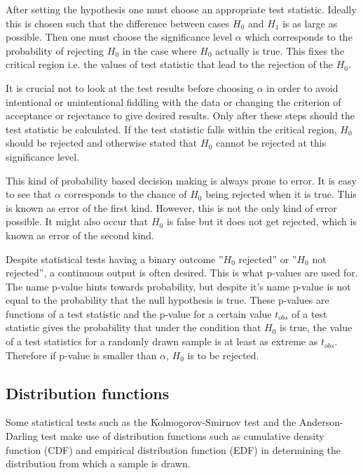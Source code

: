 \documentclass[english, oneside]{HYgradu}
\begin{document}
After setting the hypothesis one must choose an appropriate test statistic. Ideally this is chosen such that the difference between cases $H_0$ and $H_1$ is as large as possible. Then one must choose 
the significance level $\alpha$ which corresponds to the probability of rejecting $H_0$ in the case where $H_0$ actually is true. This fixes the critical region i.e. the values of test statistic that lead to the rejection of the $H_0$. \citep{bohm2010introduction, wall2003practical}

\reversemarginpar
{}
It is crucial not to look at the test results before choosing $\alpha$ in order to avoid intentional or unintentional fiddling with the data or changing the criterion of acceptance or rejectance to give desired results. Only after these steps should the test statistic be calculated. If the test statistic falls within the critical region, $H_0$ should be rejected and otherwise stated that $H_0$ cannot be rejected at this significance level. \citep{bohm2010introduction, wall2003practical}

This kind of probability based decision making is always prone to error. It is easy to see that $\alpha$ corresponds to the chance of $H_0$ being rejected when it is true. This is known as error of the first kind. However, this is not the only kind of error possible. It might also occur that $H_0$ is false but it does not get rejected, which is known as error of the second kind. \citep{bohm2010introduction}

Despite statistical tests having a binary outcome ''$H_0$ rejected'' or ''$H_0$ not rejected'', a continuous output is often desired. This is what p-values are used for. The name p-value hints towards probability, but despite it's name p-value is not equal to the probability that the null hypothesis is true. These p-values are functions of a test statistic and the p-value for a certain value $t_{obs}$ of a test statistic gives the probability that under the condition that $H_0$ is true, the value of a test statistics for a randomly drawn sample is at least as extreme as $t_{obs}$. Therefore if p-value is smaller than $\alpha$, $H_0$ is to be rejected. \citep{bohm2010introduction}

\subsection{Distribution functions}
\reversemarginpar
{}
Some statistical tests such as the Kolmogorov-Smirnov test and the Anderson-Darling test make use of distribution functions such as cumulative density function (CDF) and empirical distribution function (EDF) in determining the distribution from which a sample is drawn. %
\end{document}
